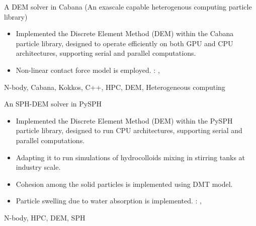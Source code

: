 %
%


\begin{experiences}
  \experience
  {} {A DEM solver in Cabana (An exascale capable heterogenous computing particle library)}{}{}
  {}    {
    \begin{itemize}
    \item Implemented the Discrete Element Method (DEM) within the Cabana
      particle library, designed to operate efficiently on both GPU and CPU
      architectures, supporting serial and parallel computations.
    \item Non-linear contact force model is employed.
      \faGithub: ,
    \end{itemize}
  }
  {N-body, Cabana, Kokkos, C++, HPC, DEM, Heterogeneous computing}

  \experience
  {} {An SPH-DEM solver in PySPH}{}{}
  {}    {
    \begin{itemize}
    \item Implemented the Discrete Element Method (DEM) within the PySPH
      particle library, designed to run CPU architectures, supporting serial and
      parallel computations.
    \item Adapting it to run simulations of hydrocolloids mixing in stirring
      tanks at industry scale.
    \item Cohesion among the solid particles is implemented using DMT model.
    \item Particle swelling due to water absorption is implemented.
      \faGithub: ,
    \end{itemize}
  }
  {N-body, HPC, DEM, SPH}


\end{experiences}
